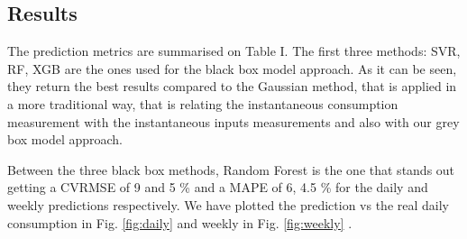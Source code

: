\documentclass[10pt, conference, compsocconf]{IEEEtran}
\begin{document}
\subsection{Results}

The prediction metrics are summarised on Table I. The first three methods: SVR, RF, XGB are the ones used for the black box model approach. As it can be seen, they return the best results compared to the Gaussian method, that is applied in a more traditional way, that is relating the instantaneous consumption measurement with the instantaneous inputs measurements and also with our grey box model approach. 

Between the three black box methods, Random Forest is the one that stands out getting a CVRMSE of 9 and 5 \%  and a MAPE of 6, 4.5 \% for the daily and weekly predictions respectively. We have plotted the prediction vs the real daily consumption in Fig. \ref{fig:daily} and weekly in Fig. \ref{fig:weekly} .

\begin{center}
\end{center}




\end{document}
